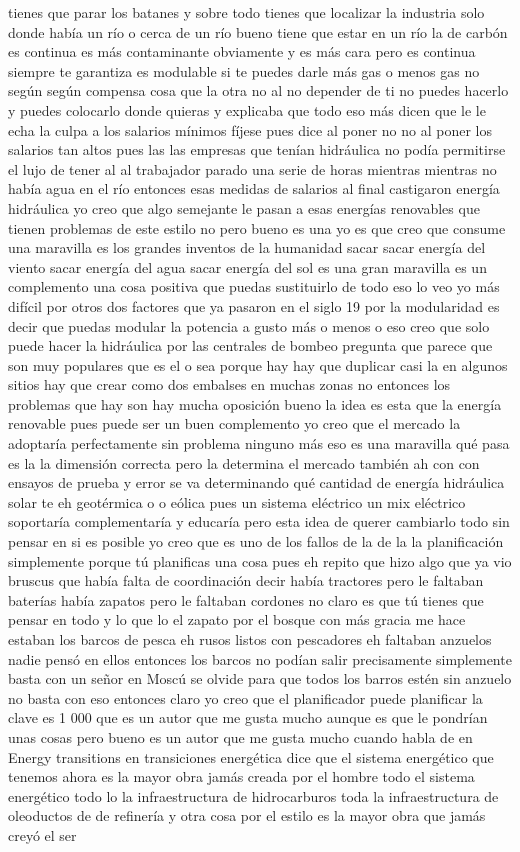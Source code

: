 tienes que parar los batanes y sobre todo tienes que localizar la industria solo donde había un río o cerca de un río bueno tiene que estar en un río la de carbón es continua es más contaminante obviamente y es más cara pero es continua siempre te garantiza es modulable si te puedes darle más gas o menos gas no según según compensa cosa que la otra no al no depender de ti no puedes hacerlo y puedes colocarlo donde quieras y explicaba que todo eso más dicen que le le echa la culpa a los salarios mínimos fíjese pues dice al poner no no al poner los salarios tan altos pues las las empresas que tenían hidráulica no podía permitirse el lujo de tener al al trabajador parado una serie de horas mientras mientras no había agua en el río entonces esas medidas de salarios al final castigaron energía hidráulica yo creo que algo semejante le pasan a esas energías renovables que tienen problemas de este estilo no pero bueno es una yo es que creo que consume una maravilla es los grandes inventos de la humanidad sacar sacar energía del viento sacar energía del agua sacar energía del sol es una gran maravilla es un complemento una cosa positiva que puedas sustituirlo de todo eso lo veo yo más difícil por otros dos factores que ya pasaron en el siglo 19 por la modularidad es decir que puedas modular la potencia a gusto más o menos o eso creo que solo puede hacer la hidráulica por las centrales de bombeo pregunta que parece que son muy populares que es el o sea porque hay hay que duplicar casi la en algunos sitios hay que crear como dos embalses en muchas zonas no entonces los problemas que hay son hay mucha oposición bueno la idea es esta que la energía renovable pues puede ser un buen complemento yo creo que el mercado la adoptaría perfectamente sin problema ninguno más eso es una maravilla qué pasa es la la dimensión correcta pero la determina el mercado también ah con con ensayos de prueba y error se va determinando qué cantidad de energía hidráulica solar te eh geotérmica o o eólica pues un sistema eléctrico un mix eléctrico soportaría complementaría y educaría pero esta idea de querer cambiarlo todo sin pensar en si es posible yo creo que es uno de los fallos de la de la la planificación simplemente porque tú planificas una cosa pues eh repito que hizo algo que ya vio bruscus que había falta de coordinación decir había tractores pero le faltaban baterías había zapatos pero le faltaban cordones no claro es que tú tienes que pensar en todo y lo que lo el zapato por el bosque con más gracia me hace estaban los barcos de pesca eh rusos listos con pescadores eh faltaban anzuelos nadie pensó en ellos entonces los barcos no podían salir precisamente simplemente basta con un señor en Moscú se olvide para que todos los barros estén sin anzuelo no basta con eso entonces claro yo creo que el planificador puede planificar la clave es 1 000 que es un autor que me gusta mucho aunque es que le pondrían unas cosas pero bueno es un autor que me gusta mucho cuando habla de en Energy transitions en transiciones energética dice que el sistema energético que tenemos ahora es la mayor obra jamás creada por el hombre todo el sistema energético todo lo la infraestructura de hidrocarburos toda la infraestructura de oleoductos de de refinería y otra cosa por el estilo es la mayor obra que jamás creyó el ser 